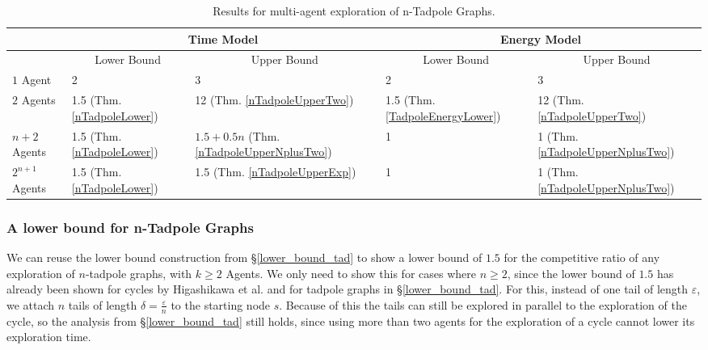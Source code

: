 \begin{table}[H]
    \small
    \centering
    \begin{tabular}{|l|ll|ll|}
    \hline
               & \multicolumn{2}{c|}{Time Model}                                     & \multicolumn{2}{c|}{Energy Model}                                   \\ \hline
               & \multicolumn{1}{c|}{Lower Bound} & \multicolumn{1}{c|}{Upper Bound} & \multicolumn{1}{c|}{Lower Bound} & \multicolumn{1}{c|}{Upper Bound} \\ \hline
    $1$ Agent    & \multicolumn{1}{l|}{2 \cite{Brandt2020}}           & 3 \cite{Fritsch2021}                               & \multicolumn{1}{l|}{2 \cite{Brandt2020}}           & 3 \cite{Fritsch2021}                               \\ \hline
    $2$ Agents  & \multicolumn{1}{l|}{1.5 (Thm. \ref{nTadpoleLower})}         & 12 (Thm. \ref{nTadpoleUpperTwo})                               & \multicolumn{1}{l|}{1.5 (Thm. \ref{TadpoleEnergyLower})}            & 12 (Thm. \ref{nTadpoleUpperTwo})                               \\ \hline
    $n+2$ Agents & \multicolumn{1}{l|}{1.5 (Thm. \ref{nTadpoleLower})}         & $1.5+0.5n$ (Thm. \ref{nTadpoleUpperNplusTwo})                         & \multicolumn{1}{l|}{1}           & 1 (Thm. \ref{nTadpoleUpperNplusTwo})                                \\ \hline
    $2^{n+1}$ Agents   & \multicolumn{1}{l|}{1.5 (Thm. \ref{nTadpoleLower})}         & 1.5 (Thm. \ref{nTadpoleUpperExp})                            & \multicolumn{1}{l|}{1}           & 1 (Thm. \ref{nTadpoleUpperNplusTwo})                               \\ \hline
    \end{tabular}
    \caption{Results for multi-agent exploration of n-Tadpole Graphs.} \label{table:ntad}
\end{table}

\subsubsection{A lower bound for n-Tadpole Graphs}\label{lower_bound_ntad}

We can reuse the lower bound construction from \S\ref{lower_bound_tad} to show a lower bound of $1.5$ for the competitive ratio of any exploration of $n$-tadpole graphs,
with $k \geq 2$ Agents. We only need to show this for cases where $n\geq2$, since the lower bound of $1.5$ has already been shown for cycles by Higashikawa et al.\cite{Higashikawa2012}
and for tadpole graphs in \S\ref{lower_bound_tad}. For this, instead of one tail of length $\varepsilon$, we attach $n$ tails of length $\delta = \frac{\varepsilon}{n}$ to the starting node $s$.
Because of this the tails can still be explored in parallel to the exploration of the cycle, so the analysis from \S\ref{lower_bound_tad} still holds, since using more than
two agents for the exploration of a cycle cannot lower its exploration time.



